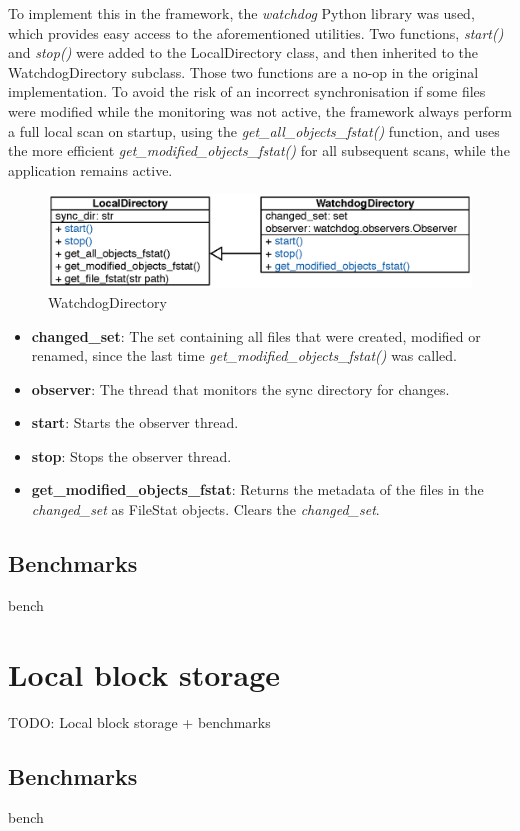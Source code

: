   To implement this in the framework, the \emph{watchdog} Python library was used, which provides easy access to the aforementioned utilities. Two functions, \emph{start()} and \emph{stop()} were added to the LocalDirectory class, and then inherited to the WatchdogDirectory subclass. Those two functions are a no-op in the original implementation. To avoid the risk of an incorrect synchronisation if some files were modified while the monitoring was not active, the framework always perform a full local scan on startup, using the \emph{get\_all\_objects\_fstat()} function, and uses the more efficient \emph{get\_modified\_objects\_fstat()} for all subsequent scans, while the application remains active.

  \begin{figure}[H]
    \centering
    \includegraphics{Images/WatchDir.eps}
    \caption{WatchdogDirectory}
    \label{fig:watchdir_uml}
  \end{figure}

  \begin{itemize}
    \item \textbf{changed\_set}: The set containing all files that were created, modified or renamed, since the last time \emph{get\_modified\_objects\_fstat()} was called.
    \item \textbf{observer}: The thread that monitors the sync directory for changes.\\

    \item \textbf{start}: Starts the observer thread.
    \item \textbf{stop}: Stops the observer thread.
    \item \textbf{get\_modified\_objects\_fstat}: Returns the metadata of the files in the \emph{changed\_set} as FileStat objects. Clears the \emph{changed\_set}.
  \end{itemize}

  \subsection{Benchmarks}
  bench

\section{Local block storage}
  TODO: Local block storage + benchmarks
  \subsection{Benchmarks}
  bench
